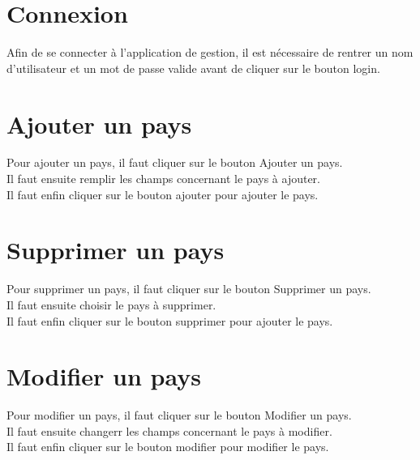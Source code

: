 \documentclass[12pt,a4paper,article]{memoir} %
\begin{document}
\section{Connexion}
Afin de se connecter à l'application de gestion, il est nécessaire de rentrer un nom d'utilisateur et un mot de passe valide avant de cliquer sur le bouton login.\\ 

\section{Ajouter un pays}
Pour ajouter un pays, il faut cliquer sur le bouton Ajouter un pays.\\
Il faut ensuite remplir les champs concernant le pays à ajouter.\\
Il faut enfin cliquer sur le bouton ajouter pour ajouter le pays.\\

\section{Supprimer un pays}
Pour supprimer un pays, il faut cliquer sur le bouton Supprimer un pays.\\
Il faut ensuite choisir le pays à supprimer.\\
Il faut enfin cliquer sur le bouton supprimer pour ajouter le pays.\\

\section{Modifier un pays}
Pour modifier un pays, il faut cliquer sur le bouton Modifier un pays.\\
Il faut ensuite changerr les champs concernant le pays à modifier.\\
Il faut enfin cliquer sur le bouton modifier pour modifier le pays.\\
\end{document}
